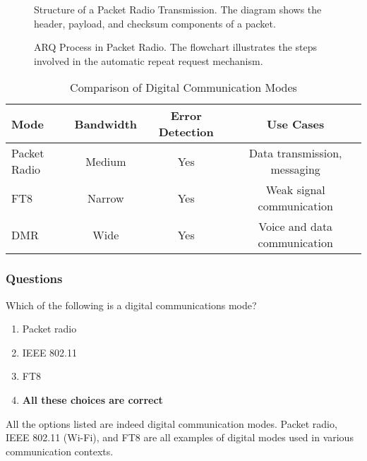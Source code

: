 \begin{figure}[htbp]
    \centering
    \caption{Structure of a Packet Radio Transmission. The diagram shows the header, payload, and checksum components of a packet.}
    \label{fig:packet-structure}
\end{figure}

\begin{figure}[htbp]
    \centering
    \caption{ARQ Process in Packet Radio. The flowchart illustrates the steps involved in the automatic repeat request mechanism.}
    \label{fig:arq-process}
\end{figure}

\begin{table}[htbp]
    \centering
    \caption{Comparison of Digital Communication Modes}
    \label{tab:digital-mode-comparison}
    \begin{tabular}{|l|c|c|c|}
        \hline
        \textbf{Mode} & \textbf{Bandwidth} & \textbf{Error Detection} & \textbf{Use Cases} \\
        \hline
        Packet Radio & Medium & Yes & Data transmission, messaging \\
        FT8 & Narrow & Yes & Weak signal communication \\
        DMR & Wide & Yes & Voice and data communication \\
        \hline
    \end{tabular}
\end{table}

\subsubsection*{Questions}

\begin{tcolorbox}[colback=gray!10!white,colframe=black!75!black,title={T8D01}]
    Which of the following is a digital communications mode?
    \begin{enumerate}[label=\Alph*),noitemsep]
        \item Packet radio
        \item IEEE 802.11
        \item FT8
        \item \textbf{All these choices are correct}
    \end{enumerate}
\end{tcolorbox}
All the options listed are indeed digital communication modes. Packet radio, IEEE 802.11 (Wi-Fi), and FT8 are all examples of digital modes used in various communication contexts.

